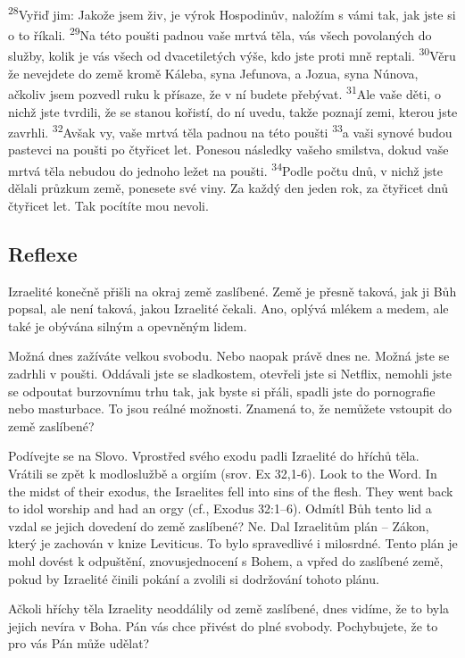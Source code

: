 \documentclass[11pt]{article}
\begin{document}
{\textsuperscript{28}Vyřiď jim: Jakože jsem živ, je výrok Hospodinův, naložím s vámi tak, jak jste si o to říkali.
\textsuperscript{29}Na této poušti padnou vaše mrtvá těla, vás všech povolaných do služby, kolik je vás všech od dvacetiletých výše, kdo jste proti mně reptali.
\textsuperscript{30}Věru že nevejdete do země kromě Káleba, syna Jefunova, a Jozua, syna Núnova, ačkoliv jsem pozvedl ruku k přísaze, že v ní budete přebývat.
\textsuperscript{31}Ale vaše děti, o nichž jste tvrdili, že se stanou kořistí, do ní uvedu, takže poznají zemi, kterou jste zavrhli.
\textsuperscript{32}Avšak vy, vaše mrtvá těla padnou na této poušti
\textsuperscript{33}a vaši synové budou pastevci na poušti po čtyřicet let. Ponesou následky vašeho smilstva, dokud vaše mrtvá těla nebudou do jednoho ležet na poušti.
\textsuperscript{34}Podle počtu dnů, v nichž jste dělali průzkum země, ponesete své viny. Za každý den jeden rok, za čtyřicet dnů čtyřicet let. Tak pocítíte mou nevoli.
}

\subsection*{Reflexe}
Izraelité konečně přišli na okraj země zaslíbené. Země je přesně taková, jak ji Bůh popsal, ale není taková,
jakou Izraelité čekali. Ano, oplývá mlékem a medem, ale také je obývána silným a opevněným lidem.

Možná dnes zažíváte velkou svobodu. Nebo naopak právě dnes ne. Možná jste se zadrhli v poušti. Oddávali
jste se sladkostem, otevřeli jste si Netflix, nemohli jste se odpoutat burzovnímu trhu tak, jak byste si přáli,
spadli jste do pornografie nebo masturbace. To jsou reálné možnosti. Znamená to, že nemůžete vstoupit do
země zaslíbené?

Podívejte se na Slovo. Vprostřed svého exodu padli Izraelité do hříchů těla. Vrátili se zpět k modloslužbě a
orgiím (srov. Ex 32,1-6). Look to the Word. In the midst of their exodus, the Israelites fell into sins of the
flesh. They went back to idol worship and had an orgy (cf., Exodus 32:1–6). Odmítl Bůh tento lid a vzdal se
jejich dovedení do země zaslíbené? Ne. Dal Izraelitům plán – Zákon, který je zachován v knize Leviticus. To
bylo spravedlivé i milosrdné. Tento plán je mohl dovést k odpuštění, znovusjednocení s Bohem, a vpřed do
zaslíbené země, pokud by Izraelité činili pokání a zvolili si dodržování tohoto plánu.

Ačkoli hříchy těla Izraelity neoddálily od země zaslíbené, dnes vidíme, že to byla jejich nevíra v Boha. Pán
vás chce přivést do plné svobody. Pochybujete, že to pro vás Pán může udělat?
\end{document}
